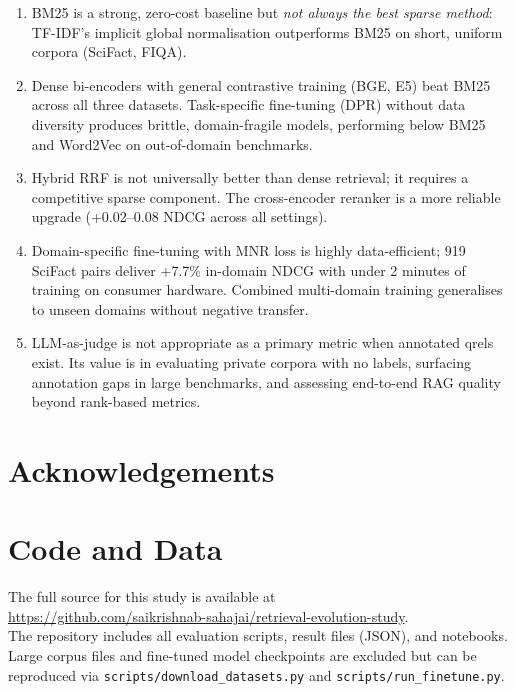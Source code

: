 \documentclass[12pt, a4paper]{article}
\newcommand{\fiqa}{FIQA}
\newcommand{\scifact}{SciFact}
\begin{document}
\begin{enumerate}
  \item BM25 is a strong, zero-cost baseline but \emph{not always the best
        sparse method}: TF-IDF's implicit global normalisation outperforms
        BM25 on short, uniform corpora (\scifact{}, \fiqa{}).
  \item Dense bi-encoders with general contrastive training (BGE, E5) beat
        BM25 across all three datasets.  Task-specific fine-tuning (DPR)
        without data diversity produces brittle, domain-fragile models,
        performing below BM25 and Word2Vec on out-of-domain benchmarks.
  \item Hybrid RRF is not universally better than dense retrieval; it
        requires a competitive sparse component.  The cross-encoder reranker
        is a more reliable upgrade (+0.02--0.08 NDCG across all settings).
  \item Domain-specific fine-tuning with MNR loss is highly data-efficient;
        919 \scifact{} pairs deliver +7.7\% in-domain NDCG with under
        2 minutes of training on consumer hardware.  Combined multi-domain
        training generalises to unseen domains without negative transfer.
  \item LLM-as-judge is not appropriate as a primary metric when
        annotated qrels exist.  Its value is in evaluating private corpora
        with no labels, surfacing annotation gaps in large benchmarks, and
        assessing end-to-end RAG quality beyond rank-based metrics.
\end{enumerate}

\section*{Acknowledgements}

\section*{Code and Data}

The full source for this study is available at\\
\url{https://github.com/saikrishnab-sahajai/retrieval-evolution-study}.\\
The repository includes all evaluation scripts, result files (JSON), and
notebooks.  Large corpus files and fine-tuned model checkpoints are excluded
but can be reproduced via \texttt{scripts/download\_datasets.py} and
\texttt{scripts/run\_finetune.py}.
\end{document}
